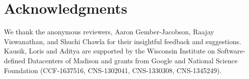 \section*{Acknowledgments}
We thank the anonymous reviewers, Aaron Gember-Jacobson, 
Raajay Viswanathan, and Shuchi Chawla 
for their insightful feedback and suggestions. 
Kausik, Loris and Aditya  
are supported by the Wisconsin Institute
on Software-defined Datacenters of Madison and 
grants from Google and National
Science Foundation (CCF-1637516, CNS-1302041, CNS-1330308, CNS-1345249).